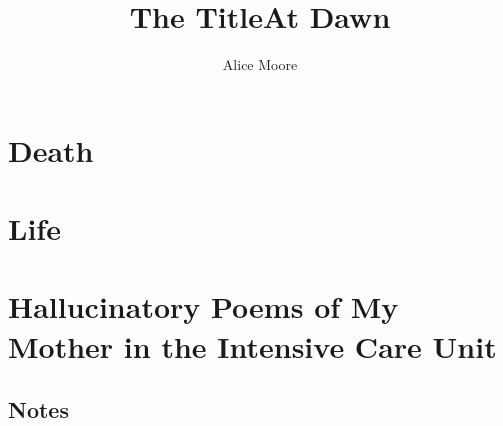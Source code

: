 \documentclass[statementpaper,oneside]{memoir}
\title{The Title}
\title{At Dawn}
\author{Alice Moore}
\date{}
\begin{document}
\begin{titlingpage}
\maketitle
\end{titlingpage}

\let\tocheadstart\relax
\tableofcontents*
\PlainPoemTitle

\renewcommand*{\beforepartskip}{\null\vskip 0pt plus 0.3fil}
\renewcommand{\printpartnum}{}
\renewcommand{\printpartname}{}
\renewcommand{\printchaptername}{}
\renewcommand{\printchapternum}{}

\part{Death}
\pagestyle{simple}










\part{Life}







\part{Hallucinatory Poems of My Mother in the Intensive Care Unit}






\renewcommand\appendixname{Notes}

\appendix

\chapter{Notes}


\end{document}
